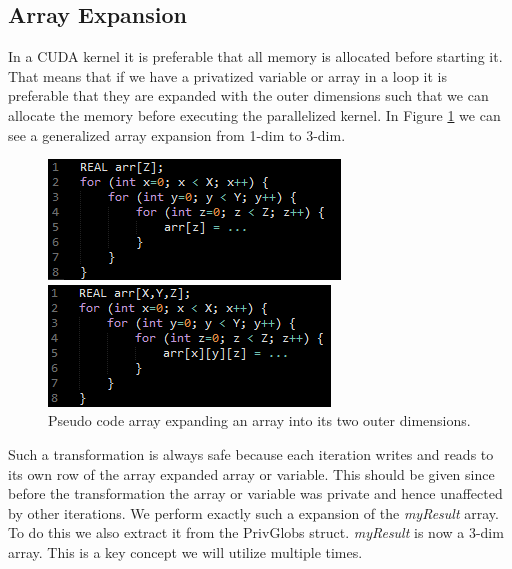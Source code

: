 \subsection{Array Expansion}
In a CUDA kernel it is preferable that all memory is allocated before
starting it. That means that if we have a privatized variable or array in a loop
it is preferable that they are expanded with the outer dimensions such that we
can allocate the memory before executing the parallelized kernel.
In Figure \ref{fig:arr_exp} we can see a generalized array expansion from 1-dim
to 3-dim.

\begin{figure}[!ht]
    \centering
    \begin{minipage}{0.49\linewidth}
        \centering
		\includegraphics[scale=0.7]{input/figures/arr_exp1.png}
    \end{minipage}
    \begin{minipage}{0.49\linewidth}
        \centering
		\includegraphics[scale=0.7]{input/figures/arr_exp2.png}
    \end{minipage}
\caption{Pseudo code array expanding an array into its two outer dimensions.\label{fig:arr_exp}}
\end{figure}

Such a transformation is always safe because each iteration writes and reads to its own
row of the array expanded array or variable. This should be given since before
the transformation the array or variable was private and hence unaffected by
other iterations.
We perform exactly such a expansion of the \emph{myResult} array. To do this we
also extract it from the PrivGlobs struct. \emph{myResult} is now a 3-dim
array. This is a key concept we will utilize multiple times.
